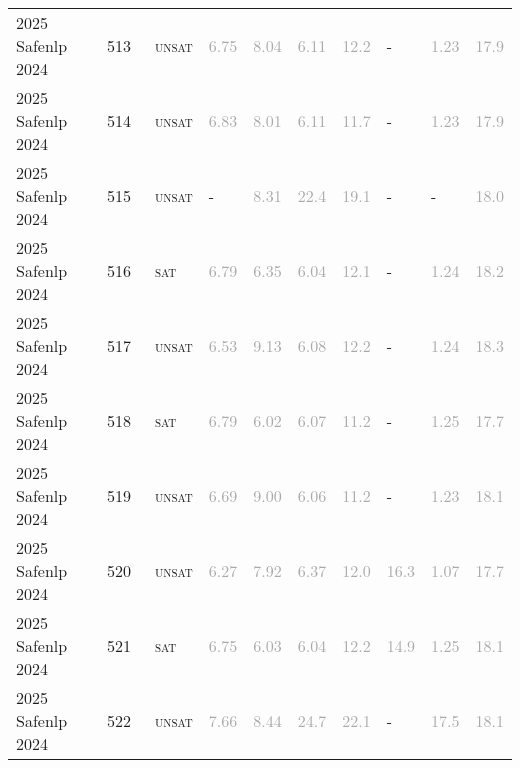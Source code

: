 \begin{center}
{\begin{longtable}{@{}llllllllll@{}}
2025 Safenlp 2024 & 513 & ~\textsc{unsat} & \textcolor{darkgray}{6.75} & \textcolor{darkgray}{8.04} & \textcolor{darkgray}{6.11} & \textcolor{darkgray}{12.2} & - & \textcolor{darkgray}{1.23} & \textcolor{darkgray}{17.9} \\
2025 Safenlp 2024 & 514 & ~\textsc{unsat} & \textcolor{darkgray}{6.83} & \textcolor{darkgray}{8.01} & \textcolor{darkgray}{6.11} & \textcolor{darkgray}{11.7} & - & \textcolor{darkgray}{1.23} & \textcolor{darkgray}{17.9} \\
2025 Safenlp 2024 & 515 & ~\textsc{unsat} & - & \textcolor{darkgray}{8.31} & \textcolor{darkgray}{22.4} & \textcolor{darkgray}{19.1} & - & - & \textcolor{darkgray}{18.0} \\
2025 Safenlp 2024 & 516 & ~\textsc{sat} & \textcolor{darkgray}{6.79} & \textcolor{darkgray}{6.35} & \textcolor{darkgray}{6.04} & \textcolor{darkgray}{12.1} & - & \textcolor{darkgray}{1.24} & \textcolor{darkgray}{18.2} \\
2025 Safenlp 2024 & 517 & ~\textsc{unsat} & \textcolor{darkgray}{6.53} & \textcolor{darkgray}{9.13} & \textcolor{darkgray}{6.08} & \textcolor{darkgray}{12.2} & - & \textcolor{darkgray}{1.24} & \textcolor{darkgray}{18.3} \\
2025 Safenlp 2024 & 518 & ~\textsc{sat} & \textcolor{darkgray}{6.79} & \textcolor{darkgray}{6.02} & \textcolor{darkgray}{6.07} & \textcolor{darkgray}{11.2} & - & \textcolor{darkgray}{1.25} & \textcolor{darkgray}{17.7} \\
2025 Safenlp 2024 & 519 & ~\textsc{unsat} & \textcolor{darkgray}{6.69} & \textcolor{darkgray}{9.00} & \textcolor{darkgray}{6.06} & \textcolor{darkgray}{11.2} & - & \textcolor{darkgray}{1.23} & \textcolor{darkgray}{18.1} \\
2025 Safenlp 2024 & 520 & ~\textsc{unsat} & \textcolor{darkgray}{6.27} & \textcolor{darkgray}{7.92} & \textcolor{darkgray}{6.37} & \textcolor{darkgray}{12.0} & \textcolor{darkgray}{16.3} & \textcolor{darkgray}{1.07} & \textcolor{darkgray}{17.7} \\
2025 Safenlp 2024 & 521 & ~\textsc{sat} & \textcolor{darkgray}{6.75} & \textcolor{darkgray}{6.03} & \textcolor{darkgray}{6.04} & \textcolor{darkgray}{12.2} & \textcolor{darkgray}{14.9} & \textcolor{darkgray}{1.25} & \textcolor{darkgray}{18.1} \\
2025 Safenlp 2024 & 522 & ~\textsc{unsat} & \textcolor{darkgray}{7.66} & \textcolor{darkgray}{8.44} & \textcolor{darkgray}{24.7} & \textcolor{darkgray}{22.1} & - & \textcolor{darkgray}{17.5} & \textcolor{darkgray}{18.1} \\

\end{longtable}}
\end{center}
